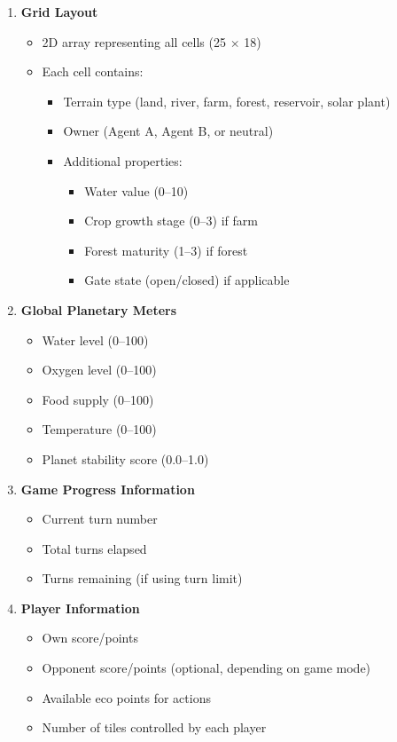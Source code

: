 \documentclass[12pt,a4paper]{article}
\begin{document}
\begin{enumerate}
    \item \textbf{Grid Layout}
    \begin{itemize}
        \item 2D array representing all cells (25 $\times$ 18)
        \item Each cell contains:
        \begin{itemize}
            \item Terrain type (land, river, farm, forest, reservoir, solar plant)
            \item Owner (Agent A, Agent B, or neutral)
            \item Additional properties:
            \begin{itemize}
                \item Water value (0--10)
                \item Crop growth stage (0--3) if farm
                \item Forest maturity (1--3) if forest
                \item Gate state (open/closed) if applicable
            \end{itemize}
        \end{itemize}
    \end{itemize}
    
    \item \textbf{Global Planetary Meters}
    \begin{itemize}
        \item Water level (0--100)
        \item Oxygen level (0--100)
        \item Food supply (0--100)
        \item Temperature (0--100)
        \item Planet stability score (0.0--1.0)
    \end{itemize}
    
    \item \textbf{Game Progress Information}
    \begin{itemize}
        \item Current turn number
        \item Total turns elapsed
        \item Turns remaining (if using turn limit)
    \end{itemize}
    
    \item \textbf{Player Information}
    \begin{itemize}
        \item Own score/points
        \item Opponent score/points (optional, depending on game mode)
        \item Available eco points for actions
        \item Number of tiles controlled by each player
    \end{itemize}
    

\end{enumerate}
\end{document}

